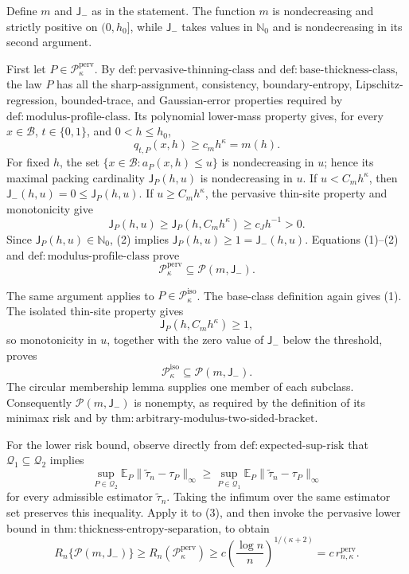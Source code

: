 Define \(m\) and \(\mathsf J_{-}\) as in the statement.  The function \(m\) is nondecreasing and strictly positive on \((0,h_0]\), while \(\mathsf J_{-}\) takes values in \(\mathbb N_0\) and is nondecreasing in its second argument.

First let \(P\in\mathcal P_{\kappa}^{\mathrm{perv}}\).  By \(\mathrm{def:pervasive\text{-}thinning\text{-}class}\) and \(\mathrm{def:base\text{-}thickness\text{-}class}\), the law \(P\) has all the sharp-assignment, consistency, boundary-entropy, Lipschitz-regression, bounded-trace, and Gaussian-error properties required by \(\mathrm{def:modulus\text{-}profile\text{-}class}\).  Its polynomial lower-mass property gives, for every \(x\in\mathcal B\), \(t\in\{0,1\}\), and \(0<h\le h_0\),
\[
 q_{t,P}(x,h)\ge c_mh^\kappa=m(h). \tag{1}
\]
For fixed \(h\), the set \(\{x\in\mathcal B:a_P(x,h)\le u\}\) is nondecreasing in \(u\); hence its maximal packing cardinality \(\mathsf J_P(h,u)\) is nondecreasing in \(u\).  If \(u<C_mh^\kappa\), then \(\mathsf J_{-}(h,u)=0\le\mathsf J_P(h,u)\).  If \(u\ge C_mh^\kappa\), the pervasive thin-site property and monotonicity give
\[
 \mathsf J_P(h,u)
 \ge\mathsf J_P(h,C_mh^\kappa)
 \ge c_Jh^{-1}>0. \tag{2}
\]
Since \(\mathsf J_P(h,u)\in\mathbb N_0\), (2) implies \(\mathsf J_P(h,u)\ge1=\mathsf J_{-}(h,u)\).  Equations (1)--(2) and \(\mathrm{def:modulus\text{-}profile\text{-}class}\) prove
\[
 \mathcal P_{\kappa}^{\mathrm{perv}}
 \subseteq\mathcal P(m,\mathsf J_{-}). \tag{3}
\]

The same argument applies to \(P\in\mathcal P_{\kappa}^{\mathrm{iso}}\).  The base-class definition again gives (1).  The isolated thin-site property gives
\[
 \mathsf J_P(h,C_mh^\kappa)\ge1, \tag{4}
\]
so monotonicity in \(u\), together with the zero value of \(\mathsf J_{-}\) below the threshold, proves
\[
 \mathcal P_{\kappa}^{\mathrm{iso}}
 \subseteq\mathcal P(m,\mathsf J_{-}). \tag{5}
\]
The circular membership lemma supplies one member of each subclass.  Consequently \(\mathcal P(m,\mathsf J_{-})\) is nonempty, as required by the definition of its minimax risk and by \(\mathrm{thm:arbitrary\text{-}modulus\text{-}two\text{-}sided\text{-}bracket}\).

For the lower risk bound, observe directly from \(\mathrm{def:expected\text{-}sup\text{-}risk}\) that \(\mathcal Q_1\subseteq\mathcal Q_2\) implies
\[
 \sup_{P\in\mathcal Q_2}
 \mathbb E_P\lVert\widetilde\tau_n-\tau_P\rVert_\infty
 \ge
 \sup_{P\in\mathcal Q_1}
 \mathbb E_P\lVert\widetilde\tau_n-\tau_P\rVert_\infty
\]
for every admissible estimator \(\widetilde\tau_n\).  Taking the infimum over the same estimator set preserves this inequality.  Apply it to (3), and then invoke the pervasive lower bound in \(\mathrm{thm:thickness\text{-}entropy\text{-}separation}\), to obtain
\[
 R_n\{\mathcal P(m,\mathsf J_{-})\}
 \ge R_n(\mathcal P_{\kappa}^{\mathrm{perv}})
 \ge c\left(\frac{\log n}{n}\right)^{1/(\kappa+2)}
 =c\,r_{n,\kappa}^{\mathrm{perv}}. \tag{6}
\]

